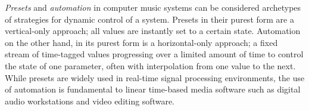 \documentclass{article}
\begin{document}





\emph{Presets} and \emph{automation} in computer music systems can be considered archetypes of strategies for dynamic control of a system. Presets in their purest form are a vertical-only approach; all values are instantly set to a certain state. Automation on the other hand, in its purest form is a horizontal-only approach; a fixed stream of time-tagged values progressing over a limited amount of time to control the state of one parameter, often with interpolation from one value to the next. While presets are widely used in real-time signal processing environments, the use of automation is fundamental to linear time-based media software such as digital audio workstations and video editing software.
\end{document}
